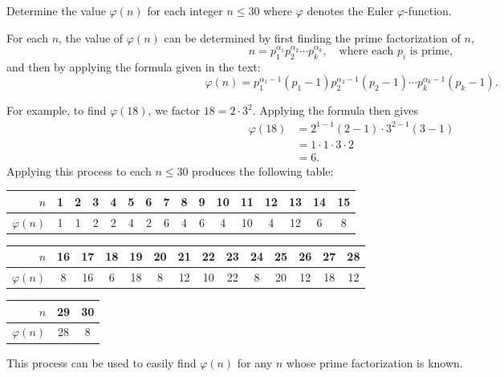  Determine the value $\varphi(n)$ for each integer
$n\leq30$ where $\varphi$ denotes the Euler $\varphi$-function.
\begin{solution}
  For each $n$, the value of $\varphi(n)$ can be determined by first
  finding the prime factorization of $n$,
  \begin{equation*}
    n = p_1^{\alpha_1}p_2^{\alpha_2}\cdots p_k^{\alpha_k},
    \quad\text{where each $p_i$ is prime},
  \end{equation*}
  and then by applying the formula given in the text:
  \begin{equation*}
    \varphi(n) = p_1^{\alpha_1 - 1}(p_1 - 1)p_2^{\alpha_2 - 1}(p_2 - 1)
    \cdots p_k^{\alpha_k - 1}(p_k - 1).
  \end{equation*}

  For example, to find $\varphi(18)$, we factor $18 =
  2\cdot3^2$. Applying the formula then gives
  \begin{align*}
    \varphi(18) &= 2^{1 - 1}(2 - 1)\cdot3^{2 - 1}(3 - 1) \\
                &= 1\cdot1\cdot3\cdot2 \\
                &= 6.
  \end{align*}
  Applying this process to each $n\leq30$ produces the following
  table:

  \medskip

  \begin{center}
    \begin{tabular}{r|c|c|c|c|c|c|c|c|c|c|c|c|c|c|c}
      $n$ & 1 & 2 & 3 & 4 & 5 & 6 & 7 & 8 & 9 & 10 & 11 & 12 & 13 & 14 & 15
      \\\hline
      $\varphi(n)$ & 1 & 1 & 2 & 2 & 4 & 2 & 6 & 4 & 6 & 4 & 10 & 4 & 12 & 6 & 8
    \end{tabular}

    \medskip
    \begin{tabular}{r|c|c|c|c|c|c|c|c|c|c|c|c|c}
      $n$ & 16 & 17 & 18 & 19 & 20 & 21 & 22 & 23 & 24 & 25 & 26 & 27 & 28
      \\\hline
      $\varphi(n)$
          & 8 & 16 & 6 & 18 & 8 & 12 & 10 & 22 & 8 & 20 & 12 & 18 & 12
    \end{tabular}

    \medskip
    \begin{tabular}{r|c|c}
      $n$ & 29 & 30 \\\hline
      $\varphi(n)$ & 28 & 8
    \end{tabular}
  \end{center}

  \medskip

  This process can be used to easily find $\varphi(n)$ for any $n$
  whose prime factorization is known.
\end{solution}

